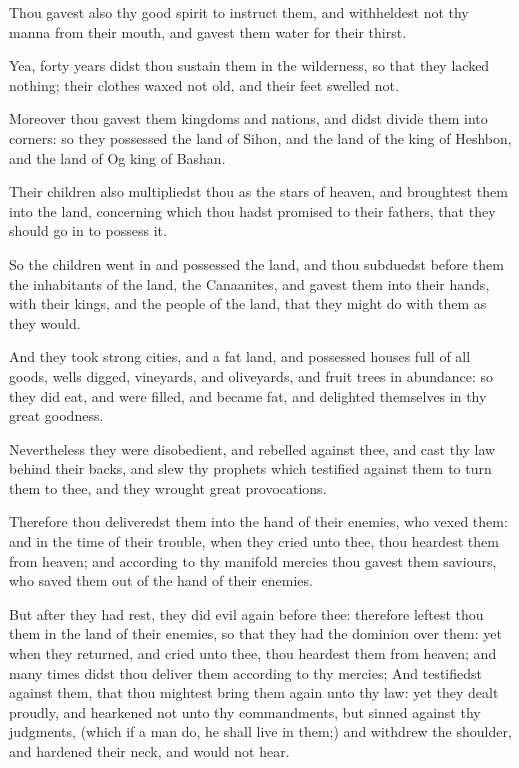 \verse Thou gavest also thy good spirit to instruct them, and withheldest not thy manna from their mouth, and gavest them water for their thirst.

\verse Yea, forty years didst thou sustain them in the wilderness, so that they lacked nothing; their clothes waxed not old, and their feet swelled not.

\verse Moreover thou gavest them kingdoms and nations, and didst divide them into corners: so they possessed the land of Sihon, and the land of the king of Heshbon, and the land of Og king of Bashan.

\verse Their children also multipliedst thou as the stars of heaven, and broughtest them into the land, concerning which thou hadst promised to their fathers, that they should go in to possess it.

\verse So the children went in and possessed the land, and thou subduedst before them the inhabitants of the land, the Canaanites, and gavest them into their hands, with their kings, and the people of the land, that they might do with them as they would.

\verse And they took strong cities, and a fat land, and possessed houses full of all goods, wells digged, vineyards, and oliveyards, and fruit trees in abundance: so they did eat, and were filled, and became fat, and delighted themselves in thy great goodness.

\verse Nevertheless they were disobedient, and rebelled against thee, and cast thy law behind their backs, and slew thy prophets which testified against them to turn them to thee, and they wrought great provocations.

\verse Therefore thou deliveredst them into the hand of their enemies, who vexed them: and in the time of their trouble, when they cried unto thee, thou heardest them from heaven; and according to thy manifold mercies thou gavest them saviours, who saved them out of the hand of their enemies.

\verse But after they had rest, they did evil again before thee: therefore leftest thou them in the land of their enemies, so that they had the dominion over them: yet when they returned, and cried unto thee, thou heardest them from heaven; and many times didst thou deliver them according to thy mercies; \verse And testifiedst against them, that thou mightest bring them again unto thy law: yet they dealt proudly, and hearkened not unto thy commandments, but sinned against thy judgments, (which if a man do, he shall live in them;) and withdrew the shoulder, and hardened their neck, and would not hear.

